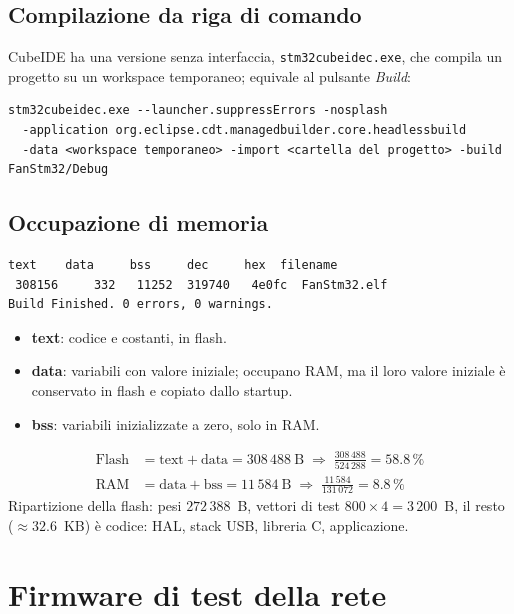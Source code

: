 \documentclass[11pt,a4paper]{article}
\newcommand{\code}[1]{\texttt{\small #1}}
\begin{document}
\subsection{Compilazione da riga di comando}
CubeIDE ha una versione senza interfaccia, \code{stm32cubeidec.exe}, che compila un progetto su un
workspace temporaneo; equivale al pulsante \emph{Build}:
\begin{lstlisting}[style=sh]
stm32cubeidec.exe --launcher.suppressErrors -nosplash
  -application org.eclipse.cdt.managedbuilder.core.headlessbuild
  -data <workspace temporaneo> -import <cartella del progetto> -build FanStm32/Debug
\end{lstlisting}

\subsection{Occupazione di memoria}
\begin{risultato}[Uscita di \code{arm-none-eabi-size}]
\begin{lstlisting}[style=sh]
   text    data     bss     dec     hex  filename
 308156     332   11252  319740   4e0fc  FanStm32.elf
Build Finished. 0 errors, 0 warnings.
\end{lstlisting}
\end{risultato}
\begin{itemize}
\item \textbf{text}: codice e costanti, in flash.
\item \textbf{data}: variabili con valore iniziale; occupano RAM, ma il loro valore iniziale è
  conservato in flash e copiato dallo startup.
\item \textbf{bss}: variabili inizializzate a zero, solo in RAM.
\end{itemize}
\begin{align}
\text{Flash} &= \text{text} + \text{data} = 308\,488\ \text{B} \;\Rightarrow\; \frac{308\,488}{524\,288} = 58.8\,\%\\
\text{RAM}   &= \text{data} + \text{bss} = 11\,584\ \text{B} \;\Rightarrow\; \frac{11\,584}{131\,072} = 8.8\,\%
\end{align}
Ripartizione della flash: pesi $272\,388$~B, vettori di test $800\times4 = 3\,200$~B,
il resto ($\approx 32.6$~KB) è codice: HAL, stack USB, libreria C, applicazione.

\section{Firmware di test della rete}
\label{sec:firmware}
\end{document}
